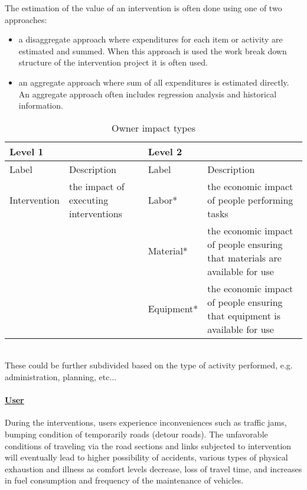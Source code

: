 The estimation of the value of an intervention is often done using one of two approaches:

\begin{itemize}
	\item a disaggregate approach where expenditures for each item or activity are estimated and summed. When this approach is used the work break down structure of the intervention project it is often used.
	\item an aggregate approach where sum of all expenditures is estimated directly. An aggregate approach often includes regression analysis and historical information. 
\end{itemize}

\begin{table}[htbp]
\caption{Owner impact types}
\begin{tabular}{|l|p{100pt}|p{70pt}|p{170pt}|}
\hline
\multicolumn{2}{|l|}{Level 1} & \multicolumn{2}{l|}{Level 2} \\ 
\hline
Label & Description & Label & Description \\ 
\hline
Intervention & the impact of executing interventions & Labor* & the economic impact of people performing tasks \\ 
\cline{3-4}
 &  & Material* & the economic impact of people ensuring that materials are available for use \\ 
\cline{3-4}
 &  & Equipment* & the economic impact of people ensuring that equipment is available for use \\ 
\hline
\end{tabular}\\
\label{tbl:22}
\footnotesize * These could be further subdivided based on the type of activity performed, e.g. administration, planning, etc...
\end{table}


\paragraph{\underline{User}}

During the interventions, users experience inconveniences such as traffic jams, bumping condition of temporarily roads (detour roads). The unfavorable conditions of traveling via the road sections and links subjected to intervention will eventually lead to higher possibility of accidents, various types of physical exhaustion and illness as comfort levels decrease, loss of travel time, and increases in fuel consumption and frequency of the maintenance of vehicles.

